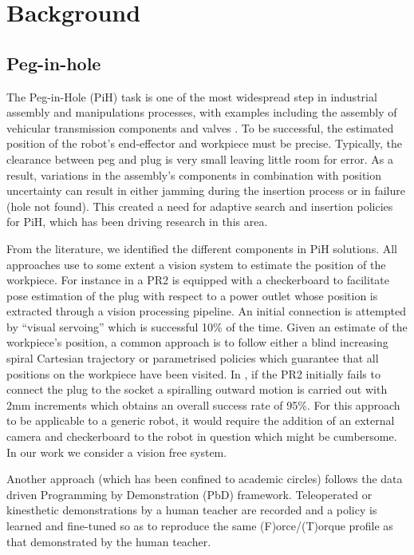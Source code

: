 \section{Background}\label{ch4:background}

\subsection{Peg-in-hole}

The Peg-in-Hole (PiH) task is one of the most widespread step in industrial assembly and manipulations processes, with 
examples including the assembly of vehicular transmission components \cite{search_strategies_icra_2001} and 
valves \cite{online_gpr_icra_2014}. To be successful, the estimated
position of the robot's end-effector and workpiece must be precise. Typically, the clearance between peg and plug 
is very small leaving little room for error. As a result, variations in the assembly's components 
in combination with position uncertainty can result in either jamming during the insertion process or in failure (hole not found). This created a need for adaptive search and insertion policies for PiH, which has been driving research 
in this area. 

From the literature, we identified the different components in PiH solutions. All approaches use to some extent a vision system to estimate the position of the workpiece. 
For instance in \cite{peg_personal_icra_2010} a PR2 is equipped with a checkerboard to facilitate pose 
estimation  of the plug with respect to a power outlet whose position is extracted through a vision 
processing pipeline. An initial connection is attempted by ``visual servoing'' which is successful 10\% of the 
time. Given an estimate of the workpiece's position, a common approach is to follow either a blind increasing spiral 
Cartesian trajectory or parametrised policies which guarantee that all positions on the workpiece have been visited.
In \cite{peg_personal_icra_2010}, if the PR2 initially fails to connect the plug to the socket
a spiralling outward motion is carried out with 2mm increments which obtains an overall 
success rate of 95\%. For this approach to be applicable to a generic robot, it would require the addition of an
external camera and checkerboard to the robot in question which might be cumbersome. In our work we consider a 
vision free system.

Another approach (which has been confined to academic circles) follows the data driven 
Programming by Demonstration (PbD) framework. Teleoperated or kinesthetic demonstrations by a human teacher 
are recorded and a policy is learned and fine-tuned so as to reproduce the same (F)orce/(T)orque profile as 
that demonstrated by the human teacher. 

